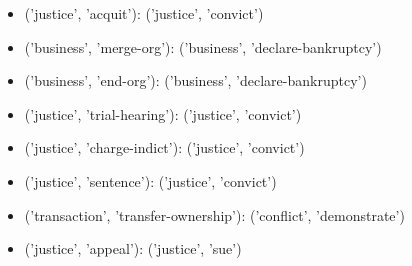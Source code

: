 \documentclass[11pt, oneside]{article}   	%
\begin{document}
\begin{itemize}
\item[] ('justice', 'acquit'): ('justice', 'convict')
\item[] ('business', 'merge-org'): ('business', 'declare-bankruptcy')
\item[] ('business', 'end-org'): ('business', 'declare-bankruptcy')
\item[] ('justice', 'trial-hearing'): ('justice', 'convict')
\item[] ('justice', 'charge-indict'): ('justice', 'convict')
\item[] ('justice', 'sentence'): ('justice', 'convict')
\item[] ('transaction', 'transfer-ownership'): ('conflict', 'demonstrate')
\item[] ('justice', 'appeal'): ('justice', 'sue')
\end{itemize}
\end{document}
